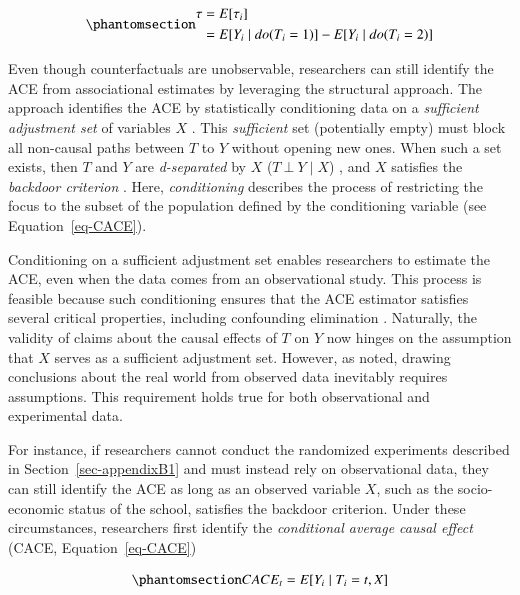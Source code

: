 \documentclass[
  authoryear,
  review,
  1p]{elsarticle}
\begin{document}
\begin{equation}\phantomsection\label{eq-ACE}{
\begin{aligned}
\tau & = E[\tau_{i}] \\
  & = E[Y_{i} \mid do(T_{i}=1)]- E[Y_{i} \mid do(T_{i}=2)]
\end{aligned}
}\end{equation}

Even though counterfactuals are unobservable, researchers can still
identify the ACE from associational estimates by leveraging the
structural approach. The approach identifies the ACE by statistically
conditioning data on a \emph{sufficient adjustment set} of variables
\(X\) \citep{Pearl_2009, Pearl_et_al_2016, Morgan_et_al_2014}. This
\emph{sufficient} set (potentially empty) must block all non-causal
paths between \(T\) to \(Y\) without opening new ones. When such a set
exists, then \(T\) and \(Y\) are \emph{d-separated} by \(X\)
(\(T \:\bot\:Y \mid X\)) \citep{Pearl_2009}, and \(X\) satisfies the
\emph{backdoor criterion} \citep[pp 37]{Neal_2020}. Here,
\emph{conditioning} describes the process of restricting the focus to
the subset of the population defined by the conditioning variable
\citep[pp.~32]{Neal_2020} (see Equation~\ref{eq-CACE}).

Conditioning on a sufficient adjustment set enables researchers to
estimate the ACE, even when the data comes from an observational study.
This process is feasible because such conditioning ensures that the ACE
estimator satisfies several critical properties, including confounding
elimination \citep{Morgan_et_al_2014}. Naturally, the validity of claims
about the causal effects of \(T\) on \(Y\) now hinges on the assumption
that \(X\) serves as a sufficient adjustment set. However, as
\citet[pp.~150]{Kohler_et_al_2019} noted, drawing conclusions about the
real world from observed data inevitably requires assumptions. This
requirement holds true for both observational and experimental data.

For instance, if researchers cannot conduct the randomized experiments
described in Section~\ref{sec-appendixB1} and must instead rely on
observational data, they can still identify the ACE as long as an
observed variable \(X\), such as the socio-economic status of the
school, satisfies the backdoor criterion. Under these circumstances,
researchers first identify the \emph{conditional average causal effect}
(CACE, Equation~\ref{eq-CACE})

\begin{equation}\phantomsection\label{eq-CACE}{
CACE_{t} = E[Y_{i} \mid T_{i}=t, X]
}\end{equation}
\end{document}
